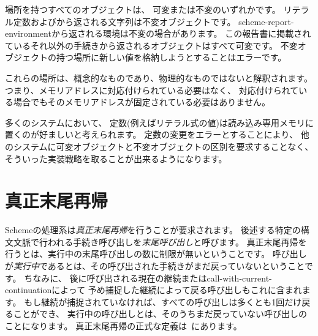 場所を持つすべてのオブジェクトは、
可変または不変のいずれかです。
リテラル定数およびから返される文字列は不変オブジェクトです。
{\cf scheme-report-environment}から返される環境は不変の場合があります。
この報告書に掲載されているそれ以外の手続きから返されるオブジェクトはすべて可変です。
不変オブジェクトの持つ場所に新しい値を格納しようとすることはエラーです。


これらの場所は、概念的なものであり、物理的なものではないと解釈されます。
つまり、メモリアドレスに対応付けられている必要はなく、
対応付けられている場合でもそのメモリアドレスが固定されている必要はありません。

\begin{rationale}
多くのシステムにおいて、
定数(例えばリテラル式の値)は読み込み専用メモリに置くのが好ましいと考えられます。
定数の変更をエラーとすることにより、
他のシステムに可変オブジェクトと不変オブジェクトの区別を要求することなく、
そういった実装戦略を取ることが出来るようになります。
\end{rationale}

\section{真正末尾再帰}
\label{proper tail recursion}

Schemeの処理系は{\em 真正末尾再帰}を行うことが要求されます。
後述する特定の構文文脈で行われる手続き呼び出しを{\em 末尾呼び出し}と呼びます。
真正末尾再帰を行うとは、実行中の末尾呼び出しの数に制限が無いということです。
呼び出しが{\em 実行中}であるとは、その呼び出された手続きがまだ戻っていないということです。
ちなみに、
後に呼び出される現在の継続または{\cf call-with-current-continuation}によって
予め捕捉した継続によって戻る呼び出しもこれに含まれます。
もし継続が捕捉されていなければ、すべての呼び出しは多くとも1回だけ戻ることができ、
実行中の呼び出しとは、そのうちまだ戻っていない呼び出しのことになります。
真正末尾再帰の正式な定義は\cite{propertailrecursion}~にあります。

